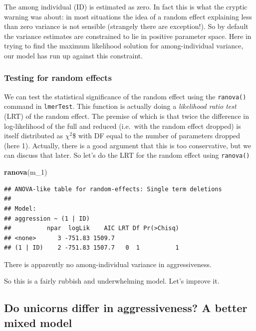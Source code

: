 \documentclass[
  12pt,
]{book}
\newenvironment{Shaded}{\begin{snugshade}}{\end{snugshade}}
\newcommand{\DecValTok}[1]{\textcolor[rgb]{0.00,0.00,0.81}{#1}}
\newcommand{\KeywordTok}[1]{\textcolor[rgb]{0.13,0.29,0.53}{\textbf{#1}}}
\newcommand{\NormalTok}[1]{#1}
\begin{document}
The among individual (ID) is estimated as zero. In fact this is what the cryptic warning was about: in most situations the idea of a random effect explaining less than zero variance is not sensible (strangely there are exception!). So by default the variance estimates are constrained to lie in positive parameter space. Here in trying to find the maximum likelihood solution for among-individual variance, our model has run up against this constraint.

\hypertarget{testing-for-random-effects}{%
\subsubsection{Testing for random effects}\label{testing-for-random-effects}}

We can test the statistical significance of the random effect using the \texttt{ranova()} command in \texttt{lmerTest}. This function is actually doing a \emph{likelihood ratio test} (LRT) of the random effect. The premise of which is that twice the difference in log-likelihood of the full and reduced (i.e.~with the random effect dropped) is itself distributed as \(\chi^2\)\$ with DF equal to the number of parameters dropped (here 1). Actually, there is a good argument that this is too conservative, but we can discuss that later. So let's do the LRT for the random effect using \texttt{ranova()}

\begin{Shaded}
\begin{Highlighting}[]
\KeywordTok{ranova}\NormalTok{(m\_}\DecValTok{1}\NormalTok{)}
\end{Highlighting}
\end{Shaded}

\begin{verbatim}
## ANOVA-like table for random-effects: Single term deletions
## 
## Model:
## aggression ~ (1 | ID)
##          npar  logLik    AIC LRT Df Pr(>Chisq)
## <none>      3 -751.83 1509.7                  
## (1 | ID)    2 -751.83 1507.7   0  1          1
\end{verbatim}

There is apparently no among-individual variance in aggressiveness.

So this is a fairly rubbish and underwhelming model. Let's improve it.

\hypertarget{do-unicorns-differ-in-aggressiveness-a-better-mixed-model}{%
\subsection{Do unicorns differ in aggressiveness? A better mixed model}\label{do-unicorns-differ-in-aggressiveness-a-better-mixed-model}}
\end{document}
